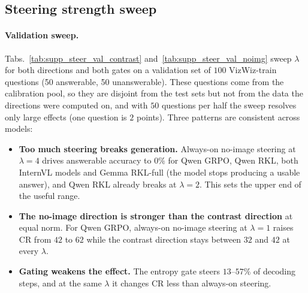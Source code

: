 \subsection{Steering strength sweep}
\label{sec:supp_steer_lambda}

\paragraph{Validation sweep.}
Tabs.~\ref{tab:supp_steer_val_contrast} and~\ref{tab:supp_steer_val_noimg} sweep $\lambda$
for both directions and both gates on a validation set of $100$ VizWiz-train questions (50
answerable, 50 unanswerable). These questions come from the calibration pool, so they are
disjoint from the test sets but not from the data the directions were computed on, and with
$50$ questions per half the sweep resolves only large effects (one question is $2$ points).
Three patterns are consistent across models:
\begin{itemize}\itemsep0pt
  \item \textbf{Too much steering breaks generation.} Always-on no-image steering at
        $\lambda{=}4$ drives answerable accuracy to $0\%$ for Qwen GRPO, Qwen RKL, both
        InternVL models and Gemma RKL-full (the model stops producing a usable answer), and
        Qwen RKL already breaks at $\lambda{=}2$. This sets the upper end of the useful
        range.
  \item \textbf{The no-image direction is stronger than the contrast direction} at equal
        norm. For Qwen GRPO, always-on no-image steering at $\lambda{=}1$ raises CR from
        $42$ to $62$ while the contrast direction stays between $32$ and $42$ at every
        $\lambda$.
  \item \textbf{Gating weakens the effect.} The entropy gate steers $13$--$57\%$ of
        decoding steps, and at the same $\lambda$ it changes CR less than always-on
        steering.
\end{itemize}

